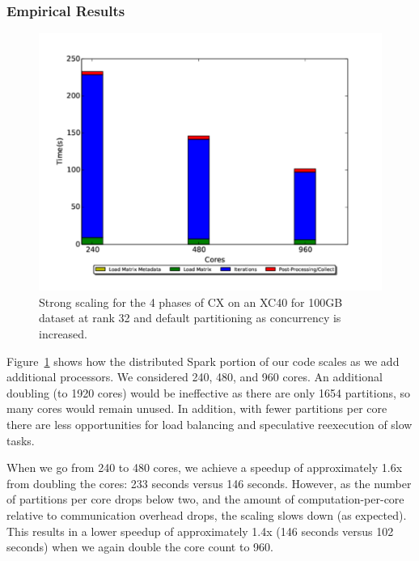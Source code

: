   \subsubsection{Empirical Results}

    \begin{figure} [H]
    \begin{centering}
    \includegraphics[scale=0.4]{images/CX_Strong_Scaling_Rank_32_Partitions_default.pdf}
    \end{centering}
    \caption{ Strong scaling for the 4 phases of CX on an XC40 for 100GB dataset at rank 32 and default partitioning as concurrency is increased.} 
    \label{fig:xc40scaling}
    \end{figure} 

Figure~\ref{fig:xc40scaling} shows how the distributed Spark portion of our code scales as we add additional processors.  We considered 240, 480, and 960 cores.  An additional doubling (to 1920 cores) would be ineffective as there are only 1654 partitions, so many cores would remain unused.  In addition, with fewer partitions per core there are less opportunities for load balancing and speculative reexecution of slow tasks.

When we go from 240 to 480 cores, we achieve a speedup of approximately 1.6x from doubling the cores: 233 seconds versus 146 seconds.  However, as the number of partitions per core drops below two, and the amount of computation-per-core relative to communication overhead drops, the scaling slows down (as expected).  This results in a lower speedup of approximately 1.4x (146 seconds versus 102 seconds) when we again double the core count to 960.

